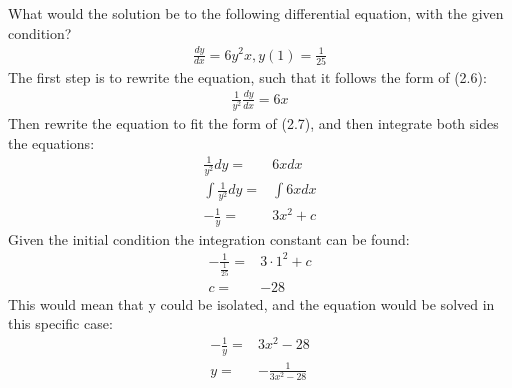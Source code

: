 \begin{tcolorbox}[colback=red!5!white,colframe=red!75!black,title=Example] 
What would the solution be to the following differential equation, with the given condition?
\begin{align*}
	\frac{dy}{dx} = 6y^2x, y(1)=\frac{1}{25}
\end{align*}
The first step is to rewrite the equation, such that it follows the form of (2.6):
\begin{align*}
	\frac{1}{y^2}\frac{dy}{dx}=6x
\end{align*}
Then rewrite the equation to fit the form of (2.7), and then integrate both sides the equations:
\begin{align*}
	\frac{1}{y^2}dy=&6x dx				\\
	\int \frac{1}{y^2}dy=&\int 6x dx		\\
	-\frac{1}{y}=&3x^2+c		
\end{align*}
Given the initial condition the integration constant can be found:
\begin{align*}
	-\frac{1}{\frac{1}{25}}=&3\cdot 1^2+c	\\
	c=&-28
\end{align*}
This would mean that y could be isolated, and the equation would be solved in this specific case:
\begin{align*}
	-\frac{1}{y}=&3x^2-28\\
	y=&-\frac{1}{3x^2-28}
\end{align*}
\end{tcolorbox}